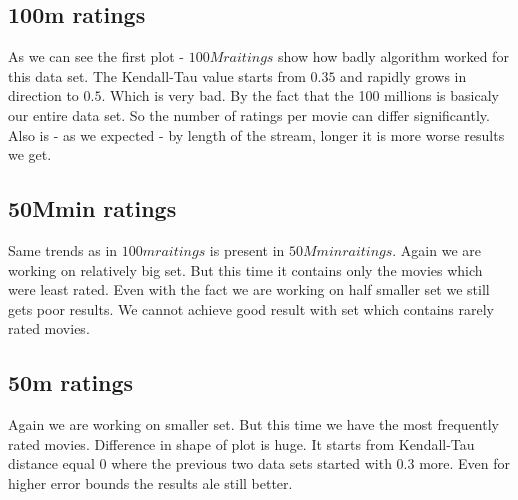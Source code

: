 \pgfplotsset{scaled x ticks=false}
\begin{center}
\end{center}

\subsection{100m ratings}		
As we can see the first plot - $100M raitings$ show how badly algorithm worked for this data set.
The Kendall-Tau value starts from $0.35$ and rapidly grows in direction to $0.5$. Which is very bad.
By the fact that the 100 millions is basicaly our entire data set. So the number of ratings per movie can differ significantly.
Also is - as we expected - by length of the stream, longer it is more worse results we get.

\subsection{50Mmin ratings}	
Same trends as in $100m raitings$ is present in $50Mmin raitings$. Again we are working on relatively big set. But this time it contains
only the movies which were least rated. Even with the fact we are working on half smaller set we still gets poor results. We cannot 
achieve good result with set which contains rarely rated movies.

\subsection{50m ratings}
Again we are working on smaller set. But this time we have the most frequently rated movies. Difference in shape of plot is huge.
It starts from Kendall-Tau distance equal $0$ where the previous two data sets started with 0.3 more. Even for higher error bounds 
the results ale still better. 

